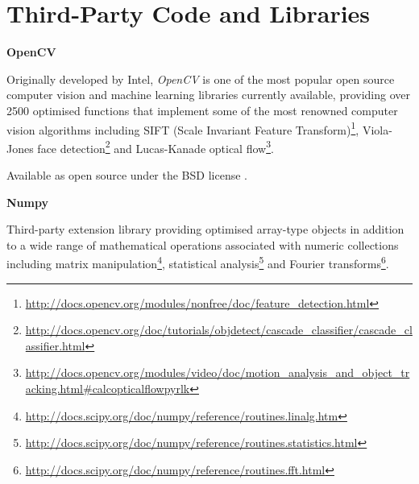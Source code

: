 \chapter{Third-Party Code and Libraries}

%
%
%
%

\textbf{OpenCV} \cite{opencv}

Originally developed by Intel, \textit{OpenCV} is one of the most popular open source computer vision and machine learning libraries currently available, providing over 2500 optimised functions that implement some of the most renowned computer vision algorithms including SIFT (Scale Invariant Feature Transform)\footnote{\url{http://docs.opencv.org/modules/nonfree/doc/feature_detection.html}}, Viola-Jones face detection\footnote{\url{http://docs.opencv.org/doc/tutorials/objdetect/cascade_classifier/cascade_classifier.html}} and Lucas-Kanade optical flow\footnote{\url{http://docs.opencv.org/modules/video/doc/motion_analysis_and_object_tracking.html#calcopticalflowpyrlk}}. 

Available as open source under the BSD license \cite{opencv-lic}.

\textbf{Numpy} \cite{numpy} 

Third-party extension library providing optimised array-type objects in addition to a wide range of mathematical operations associated with numeric collections including matrix manipulation\footnote{\url{http://docs.scipy.org/doc/numpy/reference/routines.linalg.htm}}, statistical analysis\footnote{\url{http://docs.scipy.org/doc/numpy/reference/routines.statistics.html}} and Fourier transforms\footnote{\url{http://docs.scipy.org/doc/numpy/reference/routines.fft.html}}. 

